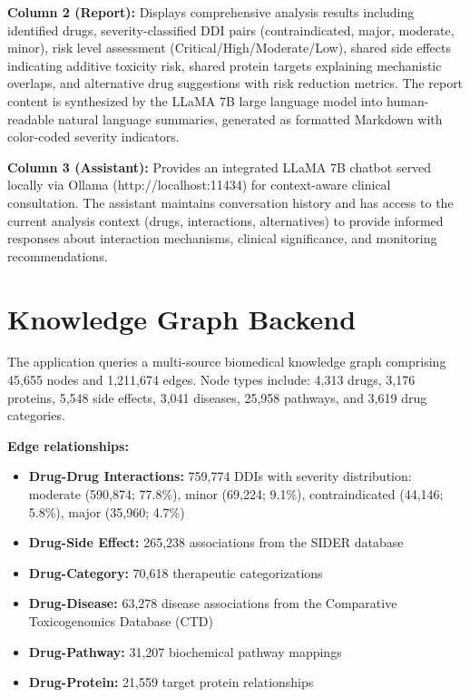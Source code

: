 \documentclass[11pt,a4paper]{article}
\begin{document}
\textbf{Column 2 (Report):} Displays comprehensive analysis results including identified drugs, severity-classified DDI pairs (contraindicated, major, moderate, minor), risk level assessment (Critical/High/Moderate/Low), shared side effects indicating additive toxicity risk, shared protein targets explaining mechanistic overlaps, and alternative drug suggestions with risk reduction metrics. The report content is synthesized by the LLaMA 7B large language model into human-readable natural language summaries, generated as formatted Markdown with color-coded severity indicators.

\textbf{Column 3 (Assistant):} Provides an integrated LLaMA 7B chatbot served locally via Ollama (http://localhost:11434) for context-aware clinical consultation. The assistant maintains conversation history and has access to the current analysis context (drugs, interactions, alternatives) to provide informed responses about interaction mechanisms, clinical significance, and monitoring recommendations.

\section{Knowledge Graph Backend}

The application queries a multi-source biomedical knowledge graph comprising 45,655 nodes and 1,211,674 edges. Node types include: 4,313 drugs, 3,176 proteins, 5,548 side effects, 3,041 diseases, 25,958 pathways, and 3,619 drug categories.

\textbf{Edge relationships:}
\begin{itemize}
\item \textbf{Drug-Drug Interactions:} 759,774 DDIs with severity distribution: moderate (590,874; 77.8\%), minor (69,224; 9.1\%), contraindicated (44,146; 5.8\%), major (35,960; 4.7\%)
\item \textbf{Drug-Side Effect:} 265,238 associations from the SIDER database
\item \textbf{Drug-Category:} 70,618 therapeutic categorizations
\item \textbf{Drug-Disease:} 63,278 disease associations from the Comparative Toxicogenomics Database (CTD)
\item \textbf{Drug-Pathway:} 31,207 biochemical pathway mappings
\item \textbf{Drug-Protein:} 21,559 target protein relationships
\end{itemize}
\end{document}
